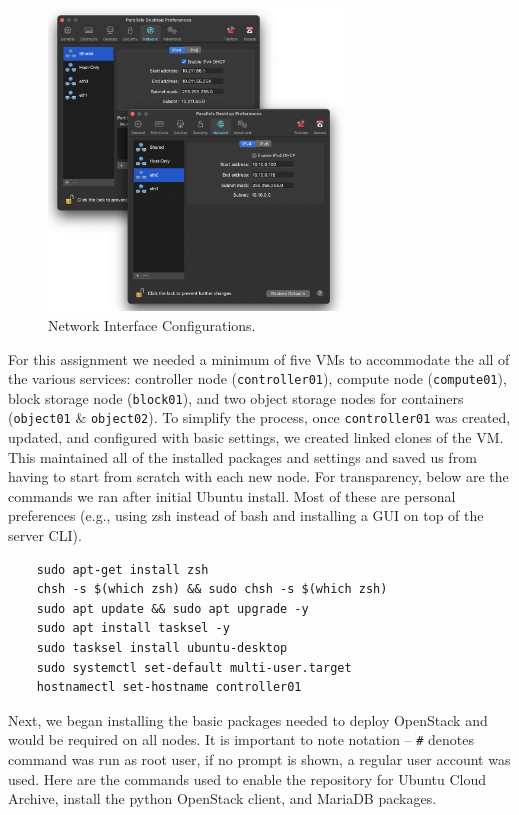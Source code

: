\documentclass{article}
\begin{document}
\begin{figure}[ht]
    \centering
    \includegraphics[width=0.7\textwidth]{Network.png}
    \caption{Network Interface Configurations.}
    \label{fig:Network}
\end{figure}

For this assignment we needed a minimum of five VMs to accommodate the all of the various services: controller node (\texttt{controller01}), compute node (\texttt{compute01}), block storage node (\texttt{block01}), and two object storage nodes for containers (\texttt{object01} \& \texttt{object02}). To simplify the process, once \texttt{controller01} was created, updated, and configured with basic settings, we created linked clones of the VM. This maintained all of the installed packages and settings and saved us from having to start from scratch with each new node. For transparency, below are the commands we ran after initial Ubuntu install. Most of these are personal preferences (e.g., using zsh instead of bash and installing a GUI on top of the server CLI).

\begin{verbatim}
    sudo apt-get install zsh
    chsh -s $(which zsh) && sudo chsh -s $(which zsh)
    sudo apt update && sudo apt upgrade -y
    sudo apt install tasksel -y
    sudo tasksel install ubuntu-desktop
    sudo systemctl set-default multi-user.target
    hostnamectl set-hostname controller01
\end{verbatim}
\newpage
Next, we began installing the basic packages needed to deploy OpenStack and would be required on all nodes. It is important to note notation -- \texttt{\#} denotes command was run as root user, if no prompt is shown, a regular user account was used. Here are the commands used to enable the repository for Ubuntu Cloud Archive, install the python OpenStack client, and MariaDB packages.
\end{document}
